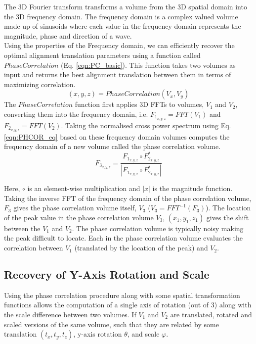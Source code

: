 The 3D Fourier transform transforms a volume from the 3D spatial domain into the 3D frequency domain. The frequency domain is a complex valued volume made up of sinusoids where each value in the frequency domain represents the magnitude, phase and direction of a wave.  \\


Using the properties of the Frequency domain, we can efficiently recover the optimal alignment translation parameters using a function called $PhaseCorrelation$ (Eq. \ref{eqn:PC_basic}). This function takes two volumes as input and returns the best alignment translation between them in terms of maximizing correlation.
\begin{equation} \label{eqn:PC_basic}
(x, y, z) = PhaseCorrelation(V_x, V_y)
\end{equation}
The $PhaseCorrelation$ function first applies 3D FFTs to volumes, $V_1$ and $V_2$, converting them into the frequency domain, i.e. $F_{1_{x,y,z}} = FFT(V_1)$ and $F_{2_{x,y,z}} = FFT(V_2)$. Taking the normalised cross power spectrum using Eq. \ref{eqn:PHCOR_eq} based on these frequency domain volumes computes the frequency domain of a new volume called the phase correlation volume. \\


\begin{equation} \label{eqn:PHCOR_eq}
F_{3_{x,y,z}} = \frac{F_{1_{x,y,z}} \circ F_{2_{x,y,z}}^*}{ | F_{1_{x,y,z}} \circ F_{2_{x,y,z}}^* | }
\end{equation}

Here, $\circ$ is an element-wise multiplication and $|x|$ is the magnitude function. Taking the inverse FFT of the frequency domain of the phase correlation volume, $F_3$ gives the phase correlation volume itself, $V_3$ ($V_3 = FFT^{-1}(F_3)$). The location of the peak value in the phase correlation volume $V_3$, $(x_1, y_1, z_1)$ gives the shift between the $V_1$ and $V_2$. The phase correlation volume is typically noisy making the peak difficult to locate. Each in the phase correlation volume evaluates the correlation between $V_1$ (translated by the location of the peak) and $V_2$.


\subsection{Recovery of Y-Axis Rotation and Scale}

Using the phase correlation procedure along with some spatial transformation functions allows the computation of a single axis of rotation (out of 3) along with the scale difference between two volumes. If $V_1$ and $V_2$ are translated, rotated and scaled versions of the same volume, such that they are related by some translation $(t_x, t_y, t_z)$, y-axis rotation $\theta$, and scale $\varphi$.\\


